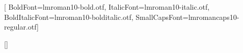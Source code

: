 \usepackage{fontspec}
\setmainfont{lmroman10-regular.otf}[
  BoldFont=lmroman10-bold.otf, ItalicFont=lmroman10-italic.otf,
  BoldItalicFont=lmroman10-bolditalic.otf, SmallCapsFont=lmromancaps10-regular.otf]
\usepackage[empty]{fullpage}
\usepackage{titlesec}
\usepackage[usenames,dvipsnames]{color}
\usepackage{enumitem}
\usepackage[hidelinks]{hyperref}
\usepackage{fancyhdr}
\usepackage[english]{babel}
\usepackage{tabularx}
\usepackage{fontawesome5}

\pagestyle{fancy}
\fancyhf{}
\fancyfoot{}
\renewcommand{\headrulewidth}{0pt}
\renewcommand{\footrulewidth}{0pt}

\addtolength{\oddsidemargin}{-0.5in}
\addtolength{\evensidemargin}{-0.5in}
\addtolength{\textwidth}{1in}
\addtolength{\topmargin}{-.5in}
\addtolength{\textheight}{1.0in}

\raggedbottom
\raggedright
\setlength{\tabcolsep}{0in}

\titleformat{\section}{\vspace{-4pt}\bfseries\raggedright\large}{}{0em}{}[\color{black}\titlerule \vspace{-5pt}]

\newcommand{\resumeItem}[1]{\item\small{{#1 \vspace{-2pt}}}}
\newcommand{\resumeSubheading}[4]{
  \vspace{-2pt}\item
    \begin{tabular*}{0.97\textwidth}[t]{l@{\extracolsep{\fill}}r}
      \textbf{#1} & \textbf{#2} \\
      \textit{\small#3} & \textit{\small #4} \\
    \end{tabular*}\vspace{-7pt}
}
\newcommand{\resumeProjectHeading}[2]{
    \item
    \begin{tabular*}{0.97\textwidth}{l@{\extracolsep{\fill}}r}
      \small#1 & \textbf{\small #2} \\
    \end{tabular*}\vspace{-7pt}
}
\renewcommand\labelitemii{$\vcenter{\hbox{\tiny$\bullet$}}$}
\newcommand{\resumeSubHeadingListStart}{\begin{itemize}[leftmargin=0.15in, label={}]}
\newcommand{\resumeSubHeadingListEnd}{\end{itemize}}
\newcommand{\resumeItemListStart}{\begin{itemize}}
\newcommand{\resumeItemListEnd}{\end{itemize}\vspace{-5pt}}

